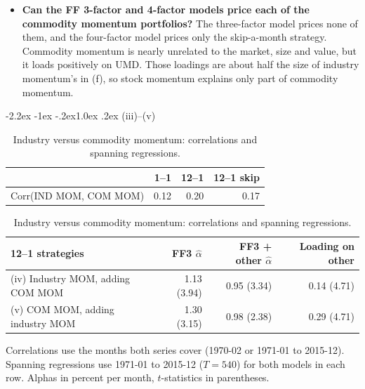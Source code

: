 \documentclass[11pt]{article}
\makeatletter
\renewcommand\subsection{\@startsection{subsection}{2}{0pt}%
  {-2.2ex \@plus -1ex \@minus -.2ex}{1.0ex \@plus .2ex}%
  {\normalfont\bfseries\normalsize\color{psink}}}
\makeatother
\begin{document}
\begin{itemize}
\setlength{\itemsep}{4pt}\setlength{\parskip}{0pt}

\item \textbf{Can the FF 3-factor and 4-factor models price each of the commodity momentum portfolios?} The three-factor model prices none of them, and the four-factor model prices only the skip-a-month strategy. Commodity momentum is nearly unrelated to the market, size and value, but it loads positively on UMD. Those loadings are about half the size of industry momentum's in (f), so stock momentum explains only part of commodity momentum.

\end{itemize}

\subsection{(iii)--(v)}

\begin{table}[H]
\centering
\caption{Industry versus commodity momentum: correlations and spanning regressions.}
\small
\begin{tabular}{lrrr}
\toprule
& 1--1 & 12--1 & 12--1 skip \\
\midrule
Corr(IND MOM, COM MOM) & 0.12 & 0.20 & 0.17 \\
\bottomrule
\end{tabular}

\vspace{8pt}
\begin{tabular}{lrrr}
\toprule
12--1 strategies & FF3 $\hat\alpha$ & FF3 + other $\hat\alpha$ & Loading on other \\
\midrule
(iv) Industry MOM, adding COM MOM & 1.13 (3.94) & 0.95 (3.34) & 0.14 (4.71) \\
(v) COM MOM, adding industry MOM & 1.30 (3.15) & 0.98 (2.38) & 0.29 (4.71) \\
\bottomrule
\end{tabular}
\vspace{2pt}\begin{minipage}{0.85\textwidth}\footnotesize
Correlations use the months both series cover (1970-02 or 1971-01 to 2015-12). Spanning regressions use 1971-01 to 2015-12 ($T = 540$) for both models in each row. Alphas in percent per month, $t$-statistics in parentheses.
\end{minipage}
\end{table}
\end{document}
